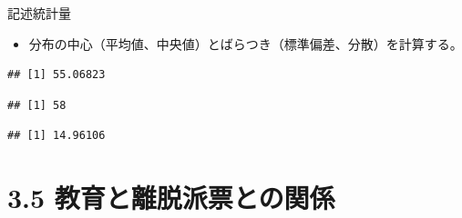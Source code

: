 \documentclass[
  ignorenonframetext,
]{beamer}
\newenvironment{Shaded}{\begin{snugshade}}{\end{snugshade}}
\newcommand{\CommentTok}[1]{\textcolor[rgb]{0.56,0.35,0.01}{\textit{#1}}}
\newcommand{\DecValTok}[1]{\textcolor[rgb]{0.00,0.00,0.81}{#1}}
\newcommand{\FunctionTok}[1]{\textcolor[rgb]{0.00,0.00,0.00}{#1}}
\newcommand{\NormalTok}[1]{#1}
\newcommand{\SpecialCharTok}[1]{\textcolor[rgb]{0.00,0.00,0.00}{#1}}
\providecommand{\tightlist}{%
  \setlength{\itemsep}{0pt}\setlength{\parskip}{0pt}}
\begin{document}
\begin{frame}[fragile]{記述統計量}
\protect\hypertarget{ux8a18ux8ff0ux7d71ux8a08ux91cf}{}
\begin{itemize}
\tightlist
\item
  分布の中心（平均値、中央値）とばらつき（標準偏差、分散）を計算する。
\end{itemize}

\begin{Shaded}
\end{Shaded}

\begin{verbatim}
## [1] 55.06823
\end{verbatim}

\begin{Shaded}
\end{Shaded}

\begin{verbatim}
## [1] 58
\end{verbatim}

\begin{Shaded}
\end{Shaded}

\begin{verbatim}
## [1] 14.96106
\end{verbatim}
\end{frame}

\hypertarget{ux6559ux80b2ux3068ux96e2ux8131ux6d3eux7968ux3068ux306eux95a2ux4fc2}{%
\section{3.5
教育と離脱派票との関係}\label{ux6559ux80b2ux3068ux96e2ux8131ux6d3eux7968ux3068ux306eux95a2ux4fc2}}
\end{document}

